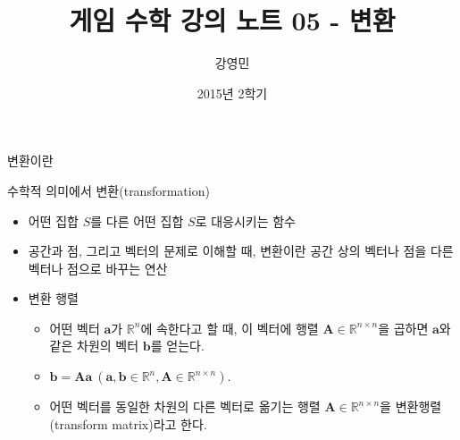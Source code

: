 \documentclass{beamer}
\title[게임수학 - 변환]{ 게임 수학 강의 노트 05 - 변환}
\author{강영민}
\institute{동명대학교}
\date{2015년 2학기}
\begin{document}
\begin{frame}
  \titlepage
\end{frame}





\begin{frame}{변환이란}

수학적 의미에서 변환(transformation)

\begin{itemize}
\item 어떤 집합 $S$를 다른 어떤 집합 $S$로 대응시키는 함수
\item 공간과 점, 그리고 벡터의 문제로 이해할 때, 변환이란 공간 상의 벡터나 점을 다른 벡터나 점으로 바꾸는 연산
\item 변환 행렬
	\begin{itemize}
	\item 어떤 벡터 $\mathbf a$가 $\mathbb R^{n}$에 속한다고 할 때, 이 벡터에 행렬 $\mathbf A \in \mathbb R^{n \times n}$을 곱하면 $\mathbf a$와 같은 차원의 벡터 $\mathbf b$를 얻는다.
	\item $\mathbf b = \mathbf A \mathbf a ~ (\mathbf a, \mathbf b \in \mathbb R^n , \mathbf A \in \mathbb R^{n \times n})$.
	\item 어떤 벡터를 동일한 차원의 다른 벡터로 옮기는 행렬 $\mathbf A \in \mathbb R^{n \times n}$을 변환행렬(transform matrix)라고 한다.
	\end{itemize}
\end{itemize}

\end{frame}
\end{document}
